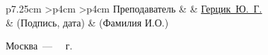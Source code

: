 \documentclass{bmstu}
\newenvironment{signstabular}[1][1]{
	\renewcommand*{\arraystretch}{#1}
	\tabular
}{
	\endtabular
}
\begin{document}
\begin{titlepage}
\begin{table}[h!]
			\vspace{\baselineskip}
			
			\begin{signstabular}[0.7]{p{7.25cm} >{\centering\arraybackslash}p{4cm} >{\centering\arraybackslash}p{4cm}}
				Преподаватель  & \uline{\mbox{\hspace*{4cm}}} & \uline{\hfill Герцик~Ю.~Г. \hfill} \\
				& \scriptsize (Подпись, дата) & \scriptsize (Фамилия И.О.)
			\end{signstabular}
			
		\end{table}
		
		\begin{center}
			\vfill
			Москва~---~\the\year
			~г.
		\end{center}
		\restoregeometry
	\end{titlepage}
	
	\maketableofcontents
	
	
	
	
	
	
	
	\makebibliography
	
\end{document}
